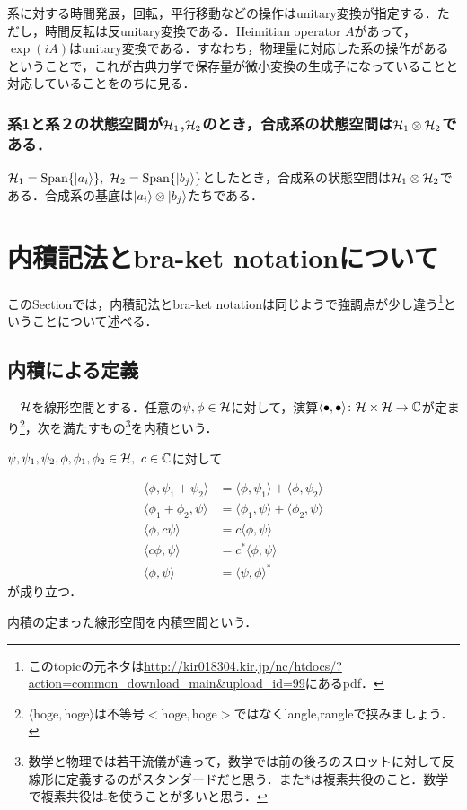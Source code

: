     系に対する時間発展，回転，平行移動などの操作はunitary変換が指定する．ただし，時間反転は反unitary変換である．Heimitian operator $A$があって，$\exp(iA)$はunitary変換である．すなわち，物理量に対応した系の操作があるということで，これが古典力学で保存量が微小変換の生成子になっていることと対応していることをのちに見る．
    \subsubsection*{系1と系２の状態空間が$\mathcal{H}_1$,$\mathcal{H}_2$のとき，合成系の状態空間は$\mathcal{H}_1\otimes\mathcal{H}_2$である．}
    
    $\h_1=\mathrm{Span}\qty{\ket{a_i}},\ \h_2=\mathrm{Span}\qty{\ket{b_j}}$としたとき，合成系の状態空間は$\mathcal{H}_1\otimes\mathcal{H}_2$である．合成系の基底は$\ket{a_i}\otimes\ket{b_j}$たちである．

\section{内積記法とbra-ket notationについて}
このSectionでは，内積記法とbra-ket notationは同じようで強調点が少し違う\footnote{このtopicの元ネタは\url{http://kir018304.kir.jp/nc/htdocs/?action=common_download_main&upload_id=99}にあるpdf．}ということについて述べる．

\subsection{内積による定義}
\begin{defn}[内積]
　$\mathcal{H}$を線形空間とする．任意の$\psi,\phi\in\mathcal{H}$に対して，演算$\langle\bullet,\bullet\rangle\colon\mathcal{H}\times\mathcal{H}\to\mathbb{C}$が定まり\footnote{$\langle\text{hoge},\text{hoge}\rangle$は不等号$<\text{hoge},\text{hoge}>$ではなくlangle,rangleで挟みましょう．}，次を満たすもの\footnote{数学と物理では若干流儀が違って，数学では前の後ろのスロットに対して反線形に定義するのがスタンダードだと思う．また$*$は複素共役のこと．数学で複素共役は$\bar{ }$を使うことが多いと思う．}を内積という．

$\psi,\psi_1,\psi_2,\phi,\phi_1,\phi_2\in\h,\ c\in\C$に対して


\begin{align}
    \langle\phi,\psi_1+\psi_2\rangle&=\langle\phi,\psi_1\rangle+\langle\phi,\psi_2\rangle\\
    \langle\phi_1+\phi_2,\psi\rangle&=\langle\phi_1,\psi\rangle+\langle\phi_2,\psi\rangle\\
     \langle\phi,c\psi\rangle&=c\langle\phi,\psi\rangle\\
    \langle c\phi,\psi\rangle&=c^{*}\langle\phi,\psi\rangle\\
    \langle\phi,\psi\rangle&=\langle\psi,\phi\rangle^{*}
\end{align}
が成り立つ．

内積の定まった線形空間を内積空間という．
\end{defn}

